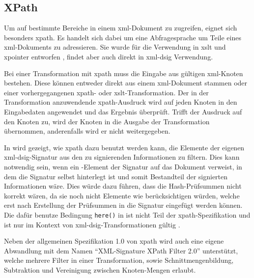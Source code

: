 \subsection{XPath}
\label{sec:XML-DSig:Transformationen:XPath}
Um auf bestimmte Bereiche in einem \gls{xml}-Dokument zu zugreifen, eignet sich besonders \gls{xpath}. Es handelt sich dabei um eine Abfragesprache um Teile
eines \gls{xml}-Dokuments zu adressieren. Sie wurde für die Verwendung in \gls{xslt} und \gls{xpointer} entworfen \cite{xpath:w3c}, findet aber auch direkt in 
\gls{xml-dsig} Verwendung.

Bei einer Transformation mit \gls{xpath} muss die Eingabe aus gültigen \gls{xml}-Knoten bestehen. Diese können entweder direkt aus einem \gls{xml}-Dokument
stammen oder einer vorhergegangenen \gls{xpath}- oder \gls{xslt}-Transformation. Der in der Transformation anzuwendende \gls{xpath}-Ausdruck wird auf jeden Knoten
in den Eingabedaten angewendet und das Ergebnis überprüft. Trifft der Ausdruck auf den Knoten zu, wird der Knoten in die Ausgabe der Transformation übernommen,
anderenfalls wird er nicht weitergegeben.



In  wird gezeigt, wie \gls{xpath} dazu benutzt werden kann, die Elemente der eigenen \gls{xml-dsig}-Signatur aus den zu
signierenden Informationen zu filtern. Dies kann notwendig sein, wenn ein -Element der Signatur auf das Dokument verweist, in dem die
Signatur selbst hinterlegt ist und somit Bestandteil der signierten Informationen wäre. Dies würde dazu führen, dass die Hash-Prüfsummen nicht korrekt wären, da
sie noch nicht Elemente wie  berücksichtigen würden, welche erst nach Erstellung der Prüfsummen in die Signatur eingefügt werden können.
Die dafür benutze Bedingung \texttt{here()} in  ist nicht Teil der \gls{xpath}-Spezifikation und ist nur im Kontext
von \gls{xml-dsig}-Transformationen gültig \cite{xml-dsig:w3c}.

Neben der allgemeinen Spezifikation 1.0 von \gls{xpath} \cite{xpath:w3c} wird auch eine eigene Abwandlung mit dem Namen "`XML-Signature XPath Filter 2.0"'
\cite{xml-dsig-filter:w3c} unterstützt, welche mehrere Filter in einer Transformation, sowie Schnittmengenbildung, Subtraktion und Vereinigung zwischen
Knoten-Mengen erlaubt.

